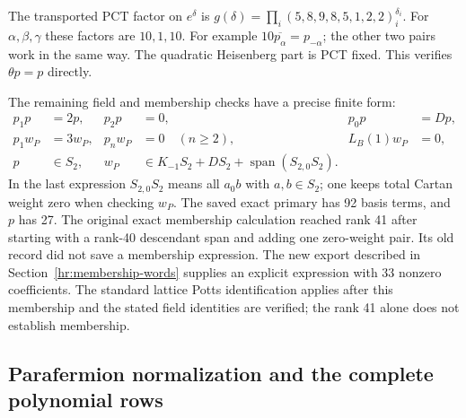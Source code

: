 The transported PCT factor on $e^\delta$ is
$g(\delta)=\prod_i(5,8,9,8,5,1,2,2)_i^{\delta_i}$.
For $\alpha,\beta,\gamma$ these factors are $10,1,10$.
For example $10\overline{p_\alpha}=p_{-\alpha}$; the other
two pairs work in the same way. The quadratic Heisenberg part is
PCT fixed. This verifies $\theta p=p$ directly.

The remaining field and membership checks have a precise finite form:
\begin{align*}
 p_1p&=2p,&p_2p&=0,&p_0p&=Dp,\\
 p_1w_P&=3w_P,&p_nw_P&=0\quad(n\geq2),&
 L_B(1)w_P&=0,\\
 p&\in S_2,&w_P&\in K_{-1}S_2+DS_2+\operatorname{span}(S_{2,0}S_2).
\end{align*}
In the last expression $S_{2,0}S_2$ means all $a_0b$ with
$a,b\in S_2$; one keeps total Cartan weight zero when checking $w_P$.
The saved exact primary has 92 basis terms, and $p$ has 27.
The original exact membership calculation reached rank 41 after
starting with a rank-40 descendant span and adding one zero-weight
pair. Its old record did not save a membership expression. The new
export described in Section~\ref{hr:membership-words} supplies an
explicit expression with 33 nonzero coefficients. The standard
lattice Potts identification applies after this membership and the
stated field identities are verified; the rank 41 alone does not
establish membership.

\subsection{Parafermion normalization and the complete polynomial rows}

